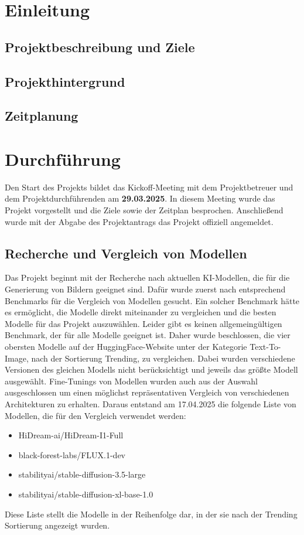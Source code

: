 \section{Einleitung}
\subsection{Projektbeschreibung und Ziele}
\subsection{Projekthintergrund}
\subsection{Zeitplanung}
\section{Durchführung}
Den Start des Projekts bildet das Kickoff-Meeting mit dem Projektbetreuer und dem Projektdurchführenden am \textbf{29.03.2025}.
In diesem Meeting wurde das Projekt vorgestellt und die Ziele sowie der Zeitplan besprochen. Anschließend wurde mit der Abgabe des Projektantrags das Projekt offiziell angemeldet.
\subsection{Recherche und Vergleich von Modellen}
Das Projekt beginnt mit der Recherche nach aktuellen KI-Modellen, die für die Generierung von Bildern geeignet sind. Dafür wurde zuerst nach entsprechend Benchmarks für die Vergleich von Modellen gesucht. Ein solcher Benchmark hätte es ermöglicht, die Modelle direkt miteinander zu vergleichen und die besten Modelle für das Projekt auszuwählen. Leider gibt es keinen allgemeingültigen Benchmark, der für alle Modelle geeignet ist. Daher wurde beschlossen, die vier obersten Modelle auf der HuggingFace-Website unter der Kategorie Text-To-Image, nach der Sortierung Trending, zu vergleichen. Dabei wurden verschiedene Versionen des gleichen Modells nicht berücksichtigt und jeweils das größte Modell ausgewählt. Fine-Tunings von Modellen wurden auch aus der Auswahl ausgeschlossen um einen möglichst repräsentativen Vergleich von verschiedenen Architekturen zu erhalten. Daraus entstand am 17.04.2025 die folgende Liste von Modellen, die für den Vergleich verwendet werden:
\begin{itemize}
    \item HiDream-ai/HiDream-I1-Full
    \item black-forest-labs/FLUX.1-dev
    \item stabilityai/stable-diffusion-3.5-large
    \item stabilityai/stable-diffusion-xl-base-1.0
\end{itemize}
Diese Liste stellt die Modelle in der Reihenfolge dar, in der sie nach der Trending Sortierung angezeigt wurden.
